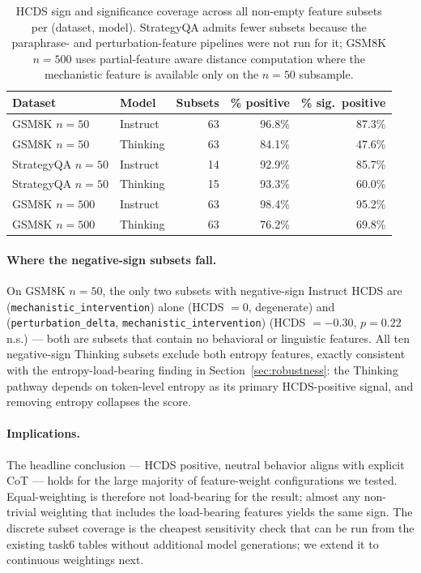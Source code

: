 \documentclass{article}
\theoremstyle{plain}
\theoremstyle{definition}
\theoremstyle{remark}
\begin{document}
\begin{table}[!htbp]
\centering
\small
\setlength{\tabcolsep}{4pt}
\begin{tabular}{@{}llrrr@{}}
\toprule
Dataset & Model & Subsets & \% positive & \% sig.\ positive \\
\midrule
GSM8K $n=50$       & Instruct & 63 & 96.8\% & 87.3\% \\
GSM8K $n=50$       & Thinking & 63 & 84.1\% & 47.6\% \\
StrategyQA $n=50$  & Instruct & 14 & 92.9\% & 85.7\% \\
StrategyQA $n=50$  & Thinking & 15 & 93.3\% & 60.0\% \\
GSM8K $n=500$      & Instruct & 63 & 98.4\% & 95.2\% \\
GSM8K $n=500$      & Thinking & 63 & 76.2\% & 69.8\% \\
\bottomrule
\end{tabular}
\caption{HCDS sign and significance coverage across all non-empty
feature subsets per (dataset, model). StrategyQA admits fewer
subsets because the paraphrase- and perturbation-feature pipelines
were not run for it; GSM8K $n=500$ uses partial-feature aware
distance computation where the mechanistic feature is available
only on the $n=50$ subsample.}
\label{tab:sensitivity}
\end{table}

\paragraph{Where the negative-sign subsets fall.} On GSM8K $n=50$,
the only two subsets with negative-sign Instruct HCDS are
(\texttt{mechanistic\_intervention}) alone (HCDS $=0$, degenerate)
and (\texttt{perturbation\_delta}, \texttt{mechanistic\_intervention})
(HCDS $=-0.30$, $p=0.22$ n.s.) --- both are subsets that contain
no behavioral or linguistic features. All ten negative-sign Thinking
subsets exclude both entropy features, exactly consistent with the
entropy-load-bearing finding in Section~\ref{sec:robustness}: the
Thinking pathway depends on token-level entropy as its primary
HCDS-positive signal, and removing entropy collapses the score.

\paragraph{Implications.} The headline conclusion --- HCDS positive,
neutral behavior aligns with explicit CoT --- holds for the large
majority of feature-weight configurations we tested. Equal-weighting
is therefore not load-bearing for the result; almost any non-trivial
weighting that includes the load-bearing features yields the same
sign. The discrete subset coverage is the cheapest sensitivity check
that can be run from the existing task6 tables without additional
model generations; we extend it to continuous weightings next.
\end{document}
